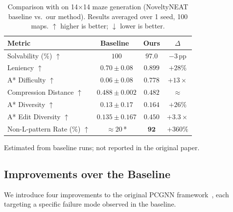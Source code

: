 

\begin{table}[h]
\centering
\caption{Comparison with \citet{beukman2022procedural} on 14$\times$14 maze generation
         (NoveltyNEAT baseline vs.\ our method). Results averaged over 1 seed, 100 maps.
         $\uparrow$ higher is better; $\downarrow$ lower is better.}
\label{tab:comparison}
\begin{tabular}{lccc}
\toprule
\textbf{Metric} & \textbf{Baseline~\cite{beukman2022procedural}} & \textbf{Ours} & \textbf{$\Delta$} \\
\midrule
Solvability (\%) $\uparrow$      & $100$               & $97.0$              & $-3$\,pp \\
Leniency $\uparrow$              & $0.70 \pm 0.08$     & $\mathbf{0.899}$    & $+28\%$ \\
A* Difficulty $\uparrow$         & $0.06 \pm 0.08$     & $\mathbf{0.778}$    & $+13\times$ \\
Compression Distance $\uparrow$  & $0.488 \pm 0.002$   & $0.482$             & $\approx$ \\
A* Diversity $\uparrow$          & $0.13 \pm 0.17$     & $\mathbf{0.164}$    & $+26\%$ \\
A* Edit Diversity $\uparrow$     & $0.135 \pm 0.167$   & $\mathbf{0.450}$    & $+3.3\times$ \\
\midrule
Non-L-pattern Rate (\%) $\uparrow$ & $\approx 20$\,* & $\mathbf{92}$      & $+360\%$ \\
\bottomrule
\end{tabular}
\begin{tablenotes}
  \small
  \item[*] Estimated from baseline runs; not reported in the original paper.
\end{tablenotes}
\end{table}



\subsection{Improvements over the Baseline}

We introduce four improvements to the original PCGNN framework~\cite{beukman2022procedural},
each targeting a specific failure mode observed in the baseline.

